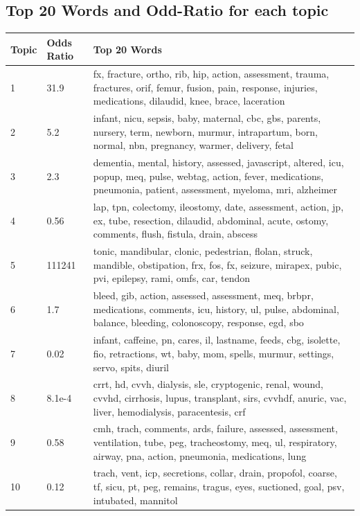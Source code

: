 \documentclass[journal]{IEEEtran}
\begin{document}
\onecolumn
\begin{appendices}
\section{Top 20 Words and Odd-Ratio for each topic}
\begin{center}
    \begin{longtable}{| p{} | p{} | p{}|}
    \hline
    Topic & Odds Ratio &  Top 20 Words \\ \hline
  1 & 31.9 & fx, fracture, ortho, rib, hip, action, assessment, trauma, fractures, orif, femur, fusion, pain, response, injuries, medications, dilaudid, knee, brace, laceration \\ \hline
  2 & 5.2 & infant, nicu, sepsis, baby, maternal, cbc, gbs, parents, nursery, term, newborn, murmur, intrapartum, born, normal, nbn, pregnancy, warmer, delivery, fetal \\ \hline
  3 & 2.3 & dementia, mental, history, assessed, javascript, altered, icu, popup, meq, pulse, webtag, action, fever, medications, pneumonia, patient, assessment, myeloma, mri, alzheimer \\ \hline
  4 & 0.56 & lap, tpn, colectomy, ileostomy, date, assessment, action, jp, ex, tube, resection, dilaudid, abdominal, acute, ostomy, comments, flush, fistula, drain, abscess \\ \hline
  5 & 111241 & tonic, mandibular, clonic, pedestrian, flolan, struck, mandible, obstipation, frx, fos, fx, seizure, mirapex, pubic, pvi, epilepsy, rami, omfs, car, tendon \\ \hline
  6 & 1.7 & bleed, gib, action, assessed, assessment, meq, brbpr, medications, comments, icu, history, ul, pulse, abdominal, balance, bleeding, colonoscopy, response, egd, sbo \\ \hline
  7 & 0.02 & infant, caffeine, pn, cares, il, lastname, feeds, cbg, isolette, fio, retractions, wt, baby, mom, spells, murmur, settings, servo, spits, diuril \\ \hline
  8 & 8.1e-4 & crrt, hd, cvvh, dialysis, sle, cryptogenic, renal, wound, cvvhd, cirrhosis, lupus, transplant, sirs, cvvhdf, anuric, vac, liver, hemodialysis, paracentesis, crf \\ \hline
  9 & 0.58 & cmh, trach, comments, ards, failure, assessed, assessment, ventilation, tube, peg, tracheostomy, meq, ul, respiratory, airway, pna, action, pneumonia, medications, lung \\ \hline
  10 & 0.12 & trach, vent, icp, secretions, collar, drain, propofol, coarse, tf, sicu, pt, peg, remains, tragus, eyes, suctioned, goal, psv, intubated, mannitol \\ \hline

\end{longtable}
\end{center}
\end{appendices}
\end{document}
